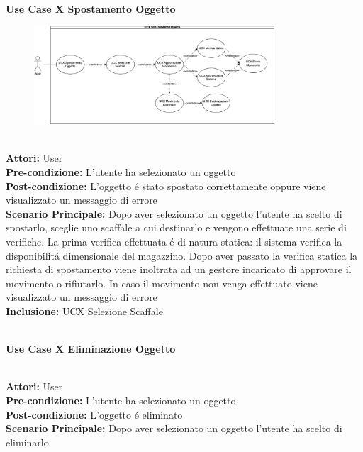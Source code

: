 \vspace{0.5cm}

\Large\textbf{}\\
\Large\textbf{Use Case X Spostamento Oggetto} \\
\begin{figure}[h]
  \centering
  \includegraphics[width=0.8\textwidth]{UseCasesImages/Spostamento.png}
\end{figure}

\vspace{0.5cm}

\large\textbf{} \\
\textbf{Attori:} User\\
\textbf{Pre-condizione:} L'utente ha selezionato un oggetto  \\
\textbf{Post-condizione: } L'oggetto é stato spostato correttamente oppure viene visualizzato un messaggio di errore\\
\textbf{Scenario Principale:}  Dopo aver selezionato un oggetto l'utente ha scelto di spostarlo, sceglie uno scaffale a cui destinarlo e vengono effettuate una serie di verifiche. La prima verifica effettuata é di natura statica: il sistema verifica la disponibilitá dimensionale del magazzino. Dopo aver passato la verifica statica la richiesta di spostamento viene inoltrata ad un gestore incaricato di approvare il movimento o rifiutarlo. In caso il movimento non venga effettuato viene visualizzato un messaggio di errore \\
\textbf{Inclusione:} UCX Selezione Scaffale \\

\vspace{0.5cm}

\Large\textbf{}\\
\Large\textbf{Use Case X Eliminazione Oggetto} \\

\vspace{0.5cm}

\large\textbf{} \\
\textbf{Attori:} User\\
\textbf{Pre-condizione:} L'utente ha selezionato un oggetto  \\
\textbf{Post-condizione: } L'oggetto é eliminato\\
\textbf{Scenario Principale:}  Dopo aver selezionato un oggetto l'utente ha scelto di eliminarlo \\

